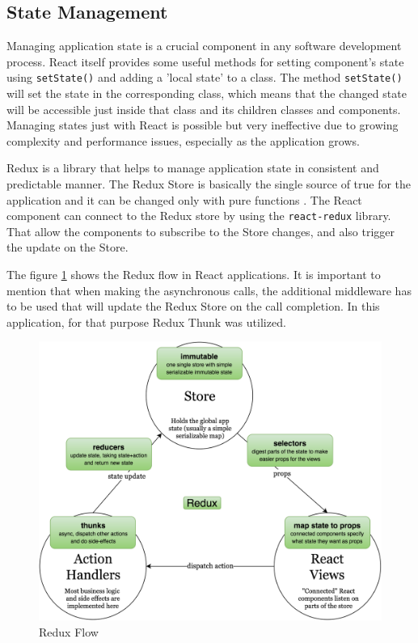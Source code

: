 \subsection{State Management} 

Managing application state is a crucial component in any software development process. React itself provides some useful methods for setting component's state using \texttt{setState()} and adding a 'local state' to a class. The method \texttt{setState()} will set the state in the corresponding class, which means that the changed state will be accessible just inside that class and its children classes and components. Managing states just with React is possible but very ineffective due to growing complexity and performance issues, especially as the application grows. 

Redux \cite{redux} is a library that helps to manage application state in consistent and predictable manner. The Redux Store is basically the single source of true for the application and it can be changed only with pure functions \cite{pure-function}. The React component can connect to the Redux store by using the \texttt{react-redux} library\cite{react-redux}. That allow the components to subscribe to the Store changes, and also trigger the update on the Store.

The figure \ref{fig:redux-flow} shows the Redux flow in React applications. It is important to mention that when making the asynchronous calls, the additional middleware has to be used that will update the Redux Store on the call completion. In this application, for that purpose Redux Thunk \cite{redux-thunk} was utilized.  

\begin{figure}[ht]
\centering
\includegraphics[width=0.7\columnwidth]{figures/redux-flow.png}
\caption{Redux Flow\cite{redux-flow}}
\label{fig:redux-flow}
\end{figure}

